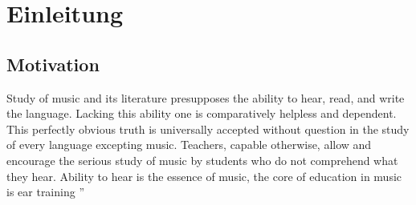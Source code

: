 \begin{abstract}
    
\end{abstract}



\chapter{Einleitung}
\section{Motivation}
\glqq 
Study of music and
its literature presupposes the ability to hear,
read, and write the language. Lacking this ability one is
comparatively helpless and dependent. This perfectly
obvious truth is universally accepted without question
in the study of every language excepting music. Teachers, capable otherwise, allow and encourage the serious
study of music by students who do not comprehend what
they hear. Ability to hear is the essence of music, the
core of education in music is ear training
''  \cite{spencer1947ear}

